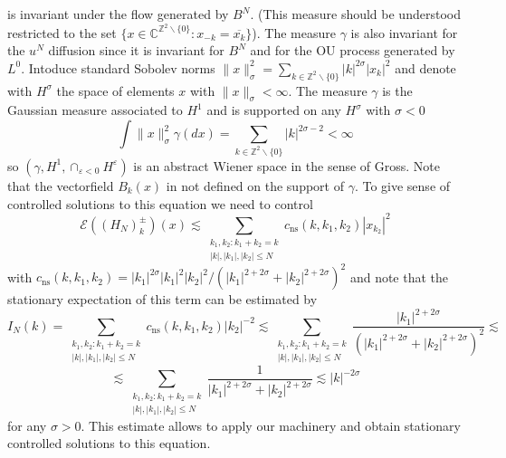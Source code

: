 \documentclass[11pt,a4paper,reqno]{amsart}
\newcommand{\ZZ}{\mathbb{Z}}
\newcommand{\CC}{\mathbb{C}}
\newcommand{\cE}{\mathcal{E}}
\newcommand{\eps}{\varepsilon}
\newcommand{\Q}{\ZZ^2\backslash\{0\}}
\begin{document}
is invariant under  the flow generated by $B^N$. (This measure should be understood restricted to the set $\{x \in \CC^{\Q} : x_{-k} = \overline{x_k} \}$).
The measure $\gamma$ is also invariant for the $u^N$ diffusion since it is invariant for $B^N$ and for the OU process generated by $L^0$.
Intoduce standard Sobolev norms
$
\|x\|_\sigma^2 = \sum_{k \in \Q} |k|^{2\sigma} |x_k|^2
$
and denote with $H^\sigma$ the space of elements $x$ with $\|x \|_{\sigma}<\infty$.
The measure $\gamma$ is the Gaussian measure associated to $H^1$ and is supported on any $H^\sigma$ with $\sigma<0$
$$
\int \|x\|_\sigma^2 \gamma(dx) = \sum_{k \in \Q}  |k|^{2\sigma-2} < \infty
$$
so $(\gamma, H^1, \cap_{\eps < 0}H^\eps)$ is an abstract Wiener space in the sense of Gross. Note that the vectorfield  $B_k(x)$ in not defined on the support of $\gamma$. To give sense of controlled solutions to this equation we need to control
$$
 \cE((H_{N})^\pm_k)(x)\lesssim     \sum_{\substack{k_1,k_2 :k_1+k_2=k\\|k|,|k_1|,|k_2|\le N}}c_{\text{ns}}(k,k_1,k_2) |x_{k_2}|^2  
$$
with $c_{\text{ns}}(k,k_1,k_2) = |k_1|^{2\sigma} |k_1|^2|k_2|^2/(|k_1|^{2+2\sigma}+|k_2|^{2+2\sigma})^2$ and note that the stationary expectation of this term can be estimated by
$$
I_N(k) =  \sum_{\substack{k_1,k_2 :k_1+k_2=k\\|k|,|k_1|,|k_2|\le N}}c_{\text{ns}}(k,k_1,k_2) |k_2|^{-2} \lesssim \sum_{\substack{k_1,k_2 :k_1+k_2=k\\|k|,|k_1|,|k_2|\le N}}\frac{|k_1|^{2+2\sigma}}{ (|k_1|^{2+2\sigma}+|k_2|^{2+2\sigma})^2}\lesssim 
$$
$$
 \lesssim \sum_{\substack{k_1,k_2 :k_1+k_2=k\\|k|,|k_1|,|k_2|\le N}}\frac{1}{ |k_1|^{2+2\sigma}+|k_2|^{2+2\sigma}}\lesssim |k|^{-2\sigma}
$$
for any $\sigma > 0$. This estimate allows to apply our machinery and obtain stationary controlled solutions to this equation. 




\end{document}
